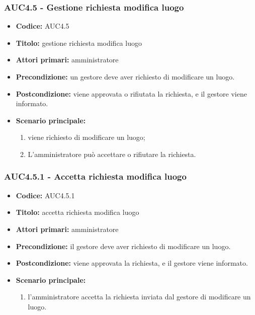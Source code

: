 \documentclass[casi-duso]{subfiles}
\begin{document}
\subsubsection{AUC4.5 - Gestione richiesta modifica luogo}%
\label{subsub:AUC4.5}
\begin{itemize}
  \item \textbf{Codice:} AUC4.5
  \item \textbf{Titolo:} gestione richiesta modifica luogo
  \item \textbf{Attori primari:} amministratore
  \item \textbf{Precondizione:} un gestore deve aver richiesto di modificare un luogo.
  \item \textbf{Postcondizione:} viene approvata o rifiutata la richiesta, e il gestore viene informato.
  \item \textbf{Scenario principale:}
  \begin{enumerate}
    \item viene richiesto di modificare un luogo;
    \item L'amministratore può accettare o rifiutare la richiesta.
  \end{enumerate}
\end{itemize}

\subsubsection{AUC4.5.1 - Accetta richiesta modifica luogo}%
\label{subsub:AUC4.5.1}
\begin{itemize}
  \item \textbf{Codice:} AUC4.5.1
  \item \textbf{Titolo:} accetta richiesta modifica luogo
  \item \textbf{Attori primari:} amministratore
  \item \textbf{Precondizione:} il gestore deve aver richiesto di modificare un luogo.
  \item \textbf{Postcondizione:} viene approvata la richiesta, e il gestore viene informato.
  \item \textbf{Scenario principale:}
  \begin{enumerate}
    \item  l'amministratore accetta la richiesta inviata dal gestore di modificare un luogo.
  \end{enumerate}
\end{itemize}
\end{document}
